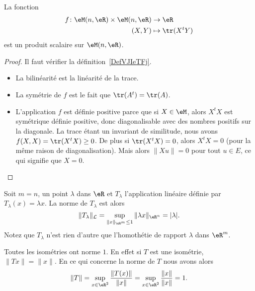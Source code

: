 \begin{proposition} \label{PropMAQoKAg}
    La fonction
    \begin{equation}
        \begin{aligned}
            f\colon \eM(n,\eR)\times \eM(n,\eR)&\to \eR \\
            (X,Y)&\mapsto \tr(X^tY)
        \end{aligned}
    \end{equation}
    est un produit scalaire sur \( \eM(n,\eR)\).
\end{proposition}

\begin{proof}
    Il faut vérifier la définition~\ref{DefVJIeTFj}.
    \begin{itemize}
        \item La bilinéarité est la linéarité de la trace.
        \item La symétrie de \( f\) est le fait que \( \tr(A^t)=\tr(A)\).
        \item L'application \( f\) est définie positive parce que si \( X\in \eM\), alors \( X^tX\) est symétrique définie positive, donc diagonalisable avec des nombres positifs sur la diagonale. La trace étant un invariant de similitude, nous avons \( f(X,X)=\tr(X^tX)\geq 0\). De plus si \( \tr(X^tX)=0\), alors \( X^tX=0\) (pour la même raison de diagonalisation). Mais alors \( \| Xu \|=0\) pour tout \( u\in E\), ce qui signifie que \( X=0\).
    \end{itemize}
\end{proof}

\begin{example}
	Soit $m=n$, un point $\lambda$ dans $\eR$ et $T_{\lambda}$ l'application linéaire définie par $T_{\lambda}(x)=\lambda x$. La norme de $T_{\lambda}$ est alors
\[
\|T_{\lambda}\|_{\mathcal{L}}=\sup_{\|x\|_{\eR^m}\leq 1}\|\lambda x\|_{\eR^n}= |\lambda|.
\]
Notez que $T_{\lambda}$ n'est rien d'autre que l'homothétie de rapport $\lambda$ dans $\eR^m$.
\end{example}

\begin{example}
	Toutes les isométries ont norme \( 1\). En effet si \( T\) est une isométrie, $\| Tx \|=\| x \|$. En ce qui concerne la norme de $T$ nous avons alors
	\begin{equation}
		\| T \|=\sup_{x\in\eR^2}\frac{ \| T(x) \| }{ \| x \| }=\sup_{x\in\eR^2}\frac{ \| x \| }{ \| x \| }=1.
	\end{equation}
\end{example}

